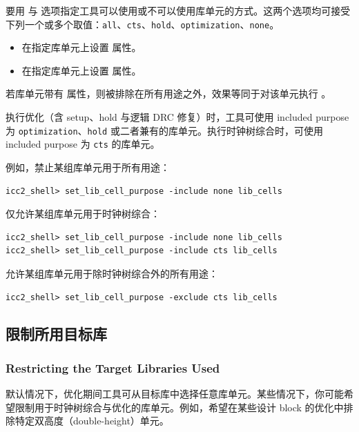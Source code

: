 要用  与  选项指定工具可以使用或不可以使用库单元的方式。这两个选项均可接受下列一个或多个取值：\texttt{all}、\texttt{cts}、\texttt{hold}、\texttt{optimization}、\texttt{none}。
\begin{itemize}
  \item {} 在指定库单元上设置  属性。
  \item {} 在指定库单元上设置  属性。
\end{itemize}

\begin{noteBox}
若库单元带有  属性，则被排除在所有用途之外，效果等同于对该单元执行 。
\end{noteBox}

执行优化（含 setup、hold 与逻辑 DRC 修复）时，工具可使用 included purpose 为 \texttt{optimization}、\texttt{hold} 或二者兼有的库单元。执行时钟树综合时，可使用 included purpose 为 \texttt{cts} 的库单元。

例如，禁止某组库单元用于所有用途：
\begin{lstlisting}
icc2_shell> set_lib_cell_purpose -include none lib_cells
\end{lstlisting}

仅允许某组库单元用于时钟树综合：
\begin{lstlisting}
icc2_shell> set_lib_cell_purpose -include none lib_cells
icc2_shell> set_lib_cell_purpose -include cts lib_cells
\end{lstlisting}

允许某组库单元用于除时钟树综合外的所有用途：
\begin{lstlisting}
icc2_shell> set_lib_cell_purpose -exclude cts lib_cells
\end{lstlisting}

\subsection{限制所用目标库}
\subsubsection*{Restricting the Target Libraries Used}

默认情况下，优化期间工具可从目标库中选择任意库单元。某些情况下，你可能希望限制用于时钟树综合与优化的库单元。例如，希望在某些设计 block 的优化中排除特定双高度（double-height）单元。

